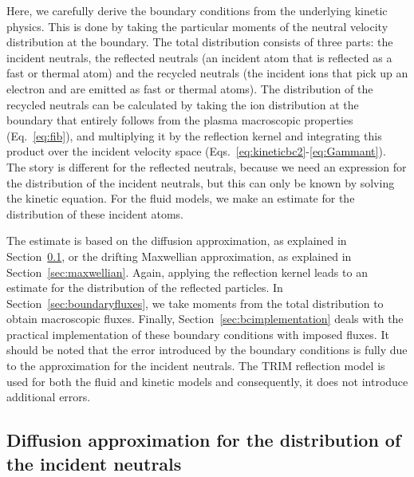 Here, we carefully derive the boundary conditions from the underlying kinetic physics. This is done by taking the particular moments of the neutral velocity distribution at the boundary. The total distribution consists of three parts: the incident neutrals, the reflected neutrals (an incident atom that is reflected as a fast or thermal atom) and the recycled neutrals (the incident ions that pick up an electron and are emitted as fast or thermal atoms). The distribution of the recycled neutrals can be calculated by taking the ion distribution at the boundary that entirely follows from the plasma macroscopic properties (Eq.~\eqref{eq:fib}), and multiplying it by the reflection kernel and integrating this product over the incident velocity space (Eqs.~\eqref{eq:kineticbc2}-\eqref{eq:Gammant}). The story is different for the reflected neutrals, because we need an expression for the distribution of the incident neutrals, but this can only be known by solving the kinetic equation. For the fluid models, we make an estimate for the distribution of these incident atoms.

The estimate is based on the diffusion approximation, as explained in Section~\ref{sec:diff}, or the drifting Maxwellian approximation, as explained in Section~\ref{sec:maxwellian}. Again, applying the reflection kernel leads to an estimate for the distribution of the reflected particles. In Section~\ref{sec:boundaryfluxes}, we take moments from the total distribution to obtain macroscopic fluxes. Finally, Section~\ref{sec:bcimplementation} deals with the practical implementation of these boundary conditions with imposed fluxes. It should be noted that the error introduced by the boundary conditions is fully due to the approximation for the incident neutrals. The TRIM reflection model is used for both the fluid and kinetic models and consequently, it does not introduce additional errors.


\subsection{Diffusion approximation for the distribution of the incident neutrals} \label{sec:diff}

